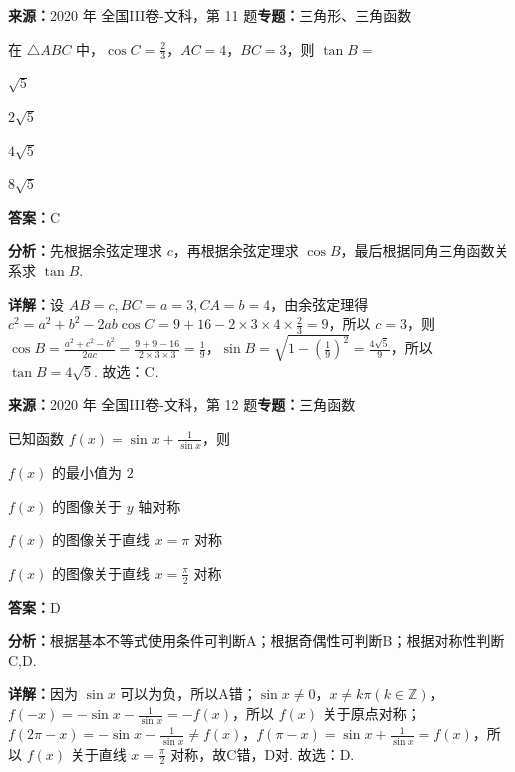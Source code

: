 \begin{question}[points=5]
\textbf{来源：}2020 年 全国III卷-文科，第 11 题\quad \textbf{专题：}三角形、三角函数\par
在 $\triangle ABC$ 中，$\cos C=\frac{2}{3}$，$AC=4$，$BC=3$，则 $\tan B=$
\begin{choices}
  \item $\sqrt{5}$
  \item $2\sqrt{5}$
  \item $4\sqrt{5}$
  \item $8\sqrt{5}$
\end{choices}
\begin{solution}
\textbf{答案：}C

\textbf{分析：}先根据余弦定理求 $c$，再根据余弦定理求 $\cos B$，最后根据同角三角函数关系求 $\tan B$.

\textbf{详解：}设 $AB=c, BC=a=3, CA=b=4$，由余弦定理得 $c^2=a^2+b^2-2ab\cos C=9+16-2\times3\times4\times\frac{2}{3}=9$，所以 $c=3$，则 $\cos B=\frac{a^2+c^2-b^2}{2ac}=\frac{9+9-16}{2\times3\times3}=\frac{1}{9}$，$\sin B=\sqrt{1-(\frac{1}{9})^2}=\frac{4\sqrt{5}}{9}$，所以 $\tan B=4\sqrt{5}$. 故选：C.
\end{solution}
\end{question}

\begin{question}[points=5]
\textbf{来源：}2020 年 全国III卷-文科，第 12 题\quad \textbf{专题：}三角函数\par
已知函数 $f(x)=\sin x+\frac{1}{\sin x}$，则
\begin{choices}
  \item $f(x)$ 的最小值为 $2$
  \item $f(x)$ 的图像关于 $y$ 轴对称
  \item $f(x)$ 的图像关于直线 $x=\pi$ 对称
  \item $f(x)$ 的图像关于直线 $x=\frac{\pi}{2}$ 对称
\end{choices}
\begin{solution}
\textbf{答案：}D

\textbf{分析：}根据基本不等式使用条件可判断A；根据奇偶性可判断B；根据对称性判断C,D.

\textbf{详解：}因为 $\sin x$ 可以为负，所以A错；$\sin x\neq0$，$x\neq k\pi(k\in\mathbb Z)$，$f(-x)=-\sin x-\frac{1}{\sin x}=-f(x)$，所以 $f(x)$ 关于原点对称；$f(2\pi-x)=-\sin x-\frac{1}{\sin x}\neq f(x)$，$f(\pi-x)=\sin x+\frac{1}{\sin x}=f(x)$，所以 $f(x)$ 关于直线 $x=\frac{\pi}{2}$ 对称，故C错，D对. 故选：D.
\end{solution}
\end{question}

